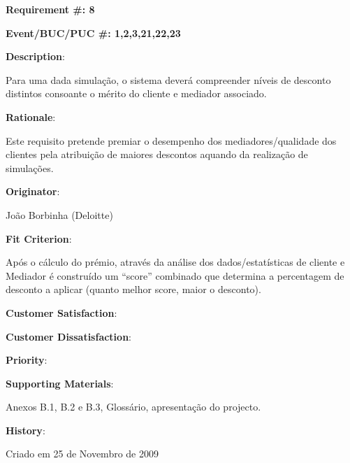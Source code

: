 \pagebreak

\begin{minipage}{0.55\textwidth}
\begin{flushleft}\textbf{Requirement \#: 8}\end{flushleft}
\end{minipage}
\begin{minipage}{0.4\textwidth}
\begin{flushright}\textbf{Event/BUC/PUC \#: 1,2,3,21,22,23}\end{flushright}
\end{minipage}

\begin{description}
\item \textbf{Description}:

Para uma dada simulação, o sistema deverá compreender níveis de desconto distintos consoante o mérito do cliente e mediador associado.\\

\item \textbf{Rationale}:

Este requisito pretende premiar o desempenho dos mediadores/qualidade dos clientes pela atribuição de maiores descontos aquando da realização de simulações.\\

\item \textbf{Originator}:

João Borbinha (Deloitte)\\

\item \textbf{Fit Criterion}:

Após o cálculo do prémio, através da análise dos dados/estatísticas de cliente e Mediador é construído um “score” combinado que determina a percentagem de desconto a aplicar (quanto melhor score, maior o desconto).\\

\begin{minipage}{0.45\textwidth}
\begin{flushleft}\item \textbf{Customer Satisfaction}:\end{flushleft}
\end{minipage}
\begin{minipage}{0.45\textwidth}
\begin{flushleft}\item \textbf{Customer Dissatisfaction}:\end{flushleft}
\end{minipage}

\item \textbf{Priority}:\\

\item \textbf{Supporting Materials}:

Anexos B.1, B.2 e B.3, Glossário, apresentação do projecto.\\

\item \textbf{History}:

Criado em 25 de Novembro de 2009\\
\end{description}

